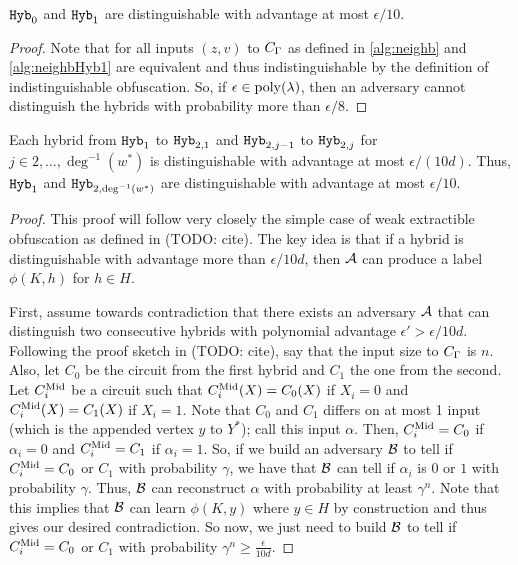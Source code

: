 \begin{lemma}
	\label{lemma:hybA}
	$\texttt{Hyb}_0$ and $\texttt{Hyb}_1$ are distinguishable with advantage at most $\epsilon / 10$.
	\begin{proof}
		Note that for all inputs $(z, v)$ to $C_\Gamma$ as defined in \cref{alg:neighb} and \cref{alg:neighbHyb1}
		are equivalent and thus indistinguishable by the definition of indistinguishable obfuscation.
		So, if $\epsilon \in \operatorname{poly}(\lambda)$, then an adversary cannot distinguish the hybrids with probability more than $\epsilon / 8$.
	\end{proof}
\end{lemma}

\begin{lemma}
	\label{lemma:hybB}
	Each hybrid from $\texttt{Hyb}_1$ to $\texttt{Hyb}_{2, 1}$ and $\texttt{Hyb}_{2, j - 1}$ to $\texttt{Hyb}_{2, j}$ for $j \in 2, \dots, \deg^{-1}(w^*)$
	is distinguishable with advantage at most $\epsilon / (10d)$. Thus, $\texttt{Hyb}_1$ and $\texttt{Hyb}_{2, \deg^{-1}(w^*)}$ are distinguishable with advantage at most $\epsilon / 10$.
	\begin{proof}
		This proof will follow very closely the simple case of weak extractible obfuscation	as defined in (TODO: cite).
		The key idea is that if a hybrid is distinguishable with advantage more than $\epsilon / 10d$, then
		$\mathcal{A}$ can produce a label $\phi(K, h)$ for $h \in H$.

		First, assume towards contradiction that there exists an adversary $\mathcal{A}$ that can distinguish two consecutive hybrids
		with polynomial advantage $\epsilon' > \epsilon / 10d$.
		Following the proof sketch in (TODO: cite), say that the input size to $C_\Gamma$ is $n$.
		Also, let $C_0$ be the circuit from the first hybrid and $C_1$ the one from the second.
		Let $C^{\text{Mid}}_i$ be a circuit such that $C^{\text{Mid}}_i(X) = C_0(X)$ if $X_i = 0$ and $C^{\text{Mid}}_i(X) = C_1(X)$ if $X_i = 1$.
		Note that $C_0$ and $C_1$ differs on at most 1 input (which is the appended vertex $y$ to $Y^*$);
		call this input $\alpha$.
		Then, $C^{\text{Mid}}_i = C_0$ if $\alpha_i = 0$ and $C^{\text{Mid}}_i = C_1$ if $\alpha_i = 1$.
		So, if we build an adversary $\mathcal{B}$ to tell if $C^{\text{Mid}}_i = C_0$ or $C_1$ with probability $\gamma$,
		we have that $\mathcal{B}$ can tell if $\alpha_i$ is $0$ or $1$ with probability $\gamma$.
		Thus, $\mathcal{B}$ can reconstruct $\alpha$ with probability at least $\gamma^n$.
		Note that this implies that $\mathcal{B}$ can learn $\phi(K, y)$ where $y \in H$ by construction
		and thus gives our desired contradiction.
		So now, we just need to build $\mathcal{B}$ to tell if $C^{\text{Mid}}_i = C_0$ or $C_1$ with probability $\gamma^n \geq \frac{\epsilon}{10d}$.


\end{proof}
\end{lemma}
